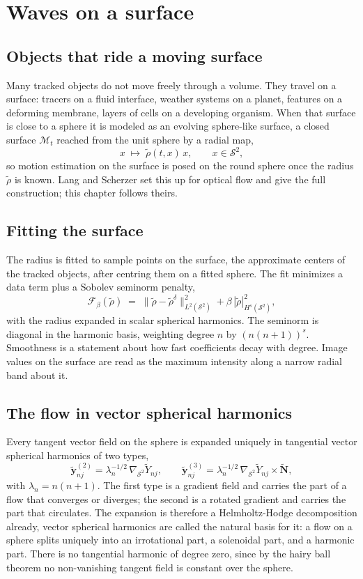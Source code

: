 \chapter{Waves on a surface}

\section{Objects that ride a moving surface}

Many tracked objects do not move freely through a volume. They travel on a surface: tracers on a
fluid interface, weather systems on a planet, features on a deforming membrane, layers of cells on a
developing organism. When that surface is close to a sphere it is modeled as an evolving sphere-like
surface, a closed surface \(\mathcal{M}_t\) reached from the unit sphere by a radial map,
\[
x \;\mapsto\; \tilde\rho(t, x)\, x, \qquad x \in \mathcal{S}^2,
\]
so motion estimation on the surface is posed on the round sphere once the radius \(\tilde\rho\) is
known. Lang and Scherzer set this up for optical flow and give the full construction; this chapter
follows theirs.

\section{Fitting the surface}

The radius is fitted to sample points on the surface, the approximate centers of the tracked
objects, after centring them on a fitted sphere. The fit minimizes a data term plus a Sobolev
seminorm penalty,
\[
\mathcal{F}_\beta(\tilde\rho) \;=\; \|\tilde\rho - \tilde\rho^{\delta}\|^2_{L^2(\mathcal{S}^2)}
+ \beta\, |\tilde\rho|^2_{H^s(\mathcal{S}^2)},
\]
with the radius expanded in scalar spherical harmonics. The seminorm is diagonal in the harmonic
basis, weighting degree \(n\) by \((n(n+1))^s\). Smoothness is a statement about how fast coefficients
decay with degree. Image values on the surface are read as the maximum intensity along a narrow
radial band about it.

\section{The flow in vector spherical harmonics}

Every tangent vector field on the sphere is expanded uniquely in tangential vector spherical
harmonics of two types,
\[
\tilde{\mathbf{y}}^{(2)}_{nj} = \lambda_n^{-1/2}\, \nabla_{\mathcal{S}^2} \tilde Y_{nj}, \qquad
\tilde{\mathbf{y}}^{(3)}_{nj} = \lambda_n^{-1/2}\, \nabla_{\mathcal{S}^2} \tilde Y_{nj} \times \tilde{\mathbf{N}},
\]
with \(\lambda_n = n(n+1)\). The first type is a gradient field and carries the part of a flow that
converges or diverges; the second is a rotated gradient and carries the part that circulates. The
expansion is therefore a Helmholtz-Hodge decomposition already,  vector spherical
harmonics are called the natural basis for it: a flow on a sphere splits uniquely into an
irrotational part, a solenoidal part, and a harmonic part. There is no tangential harmonic of degree
zero, since by the hairy ball theorem no non-vanishing tangent field is constant over the sphere.

